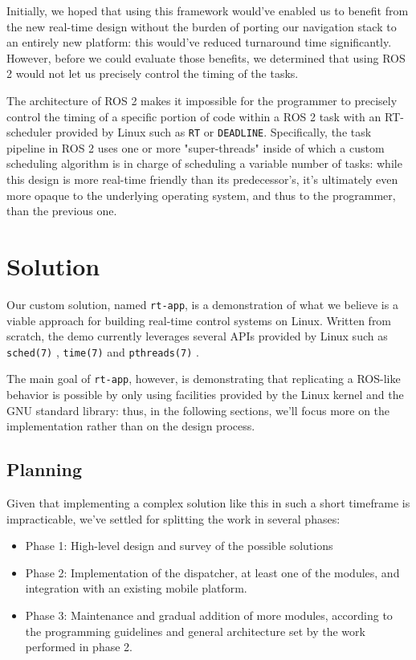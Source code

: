 \documentclass[a4paper,12pt]{report}
\begin{document}
Initially, we hoped that using this framework would've enabled us to benefit from the new real-time design without the burden of porting our navigation stack to an entirely new platform: this would've reduced turnaround time significantly. However, before we could evaluate those benefits, we determined that using ROS 2 would not let us precisely control the timing of the tasks.

The architecture of ROS 2 makes it impossible for the programmer to precisely control the timing of a specific portion of code within a ROS 2 task with an RT-scheduler provided by Linux such as \texttt{RT} or \texttt{DEADLINE}. Specifically, the task pipeline in ROS 2 uses one or more "super-threads" inside of which a custom scheduling algorithm is in charge of scheduling a variable number of tasks\cite{ros2-rt-analysis}: while this design is more real-time friendly than its predecessor's, it's ultimately even more opaque to the underlying operating system, and thus to the programmer, than the previous one.

\newpage
\chapter{Solution}

Our custom solution, named \texttt{rt-app}, is a demonstration of what we believe is a viable approach for building real-time control systems on Linux. Written from scratch, the demo currently leverages several APIs provided by Linux such as \texttt{sched(7)} \cite{man-sched-7}, \texttt{time(7)} \cite{man-time-7} and \texttt{pthreads(7)} \cite{man-pthreads-7}.

The main goal of \texttt{rt-app}, however, is demonstrating that replicating a ROS-like behavior is possible by only using facilities provided by the Linux kernel and the GNU standard library: thus, in the following sections, we'll focus more on the implementation rather than on the design process.

\section{Planning}

Given that implementing a complex solution like this in such a short timeframe is impracticable, we've settled for splitting the work in several phases:
\begin{itemize}
  \item Phase 1: High-level design and survey of the possible solutions
  \item Phase 2: Implementation of the dispatcher, at least one of the modules, and integration with an existing mobile platform.
  \item Phase 3: Maintenance and gradual addition of more modules, according to the programming guidelines and general architecture set by the work performed in phase 2.
\end{itemize}
\end{document}
